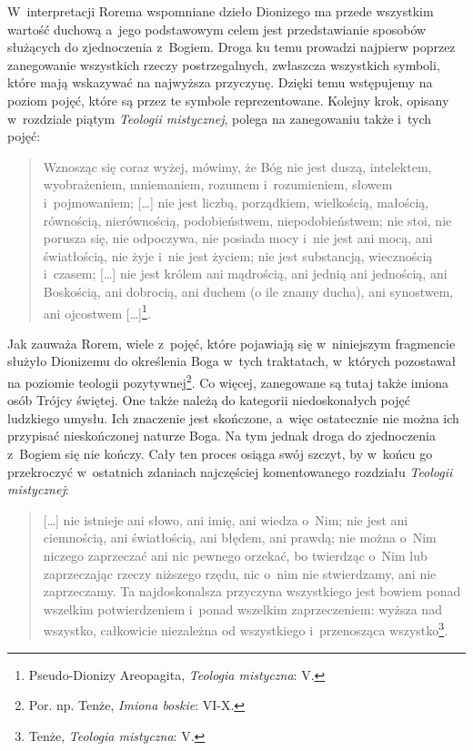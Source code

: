 W~interpretacji Rorema wspomniane dzieło Dionizego ma przede wszystkim wartość duchową a~jego podstawowym celem jest przedstawianie sposobów służących do zjednoczenia z~Bogiem. Droga ku temu prowadzi najpierw poprzez zanegowanie wszystkich rzeczy postrzegalnych, zwłaszcza wszystkich symboli, które mają wskazywać na najwyższa przyczynę. Dzięki temu wstępujemy na poziom pojęć, które są przez te symbole reprezentowane. Kolejny krok, opisany w~rozdziale piątym \textit{Teologii mistycznej}, polega na zanegowaniu także i~tych pojęć:

\begin{quote}
Wznosząc się coraz wyżej, mówimy, że Bóg nie jest duszą, intelektem, wyobrażeniem, mniemaniem, rozumem i~rozumieniem, słowem i~pojmowaniem; [\ldots] nie jest liczbą, porządkiem, wielkością, małością, równością, nierównością, podobieństwem, niepodobieństwem; nie stoi, nie porusza się, nie odpoczywa, nie posiada mocy i~nie jest ani mocą, ani światłością, nie żyje i~nie jest życiem; nie jest substancją, wiecznością i~czasem; [\ldots] nie jest królem ani mądrością, ani jednią ani jednością, ani Boskością, ani dobrocią, ani duchem (o ile znamy ducha), ani synostwem, ani ojcostwem [\ldots]\footnote{Pseudo-Dionizy Areopagita, \textit{Teologia mistyczna}: V.}.
\end{quote}

Jak zauważa Rorem, wiele z~pojęć, które pojawiają się w~niniejszym fragmencie służyło Dionizemu do określenia Boga w~tych traktatach, w~których pozostawał na poziomie teologii pozytywnej\footnote{Por. np. Tenże, \textit{Imiona boskie}: VI-X.}. Co więcej, zanegowane są tutaj także imiona osób Trójcy świętej. One także należą do kategorii niedoskonałych pojęć ludzkiego umysłu. Ich znaczenie jest skończone, a~więc ostatecznie nie można ich przypisać nieskończonej naturze Boga. Na tym jednak droga do zjednoczenia z~Bogiem się nie kończy. Cały ten proces osiąga swój szczyt, by w~końcu go przekroczyć w~ostatnich zdaniach najczęściej komentowanego rozdziału \textit{Teologii mistycznej}:

\begin{quote}
[\ldots] nie istnieje ani słowo, ani imię, ani wiedza o~Nim; nie jest ani ciemnością, ani światłością, ani błędem, ani prawdą; nie można o~Nim niczego zaprzeczać ani nic pewnego orzekać, bo twierdząc o~Nim lub zaprzeczając rzeczy niższego rzędu, nic o~nim nie stwierdzamy, ani nie zaprzeczamy. Ta najdoskonalsza przyczyna wszystkiego jest bowiem ponad wszelkim potwierdzeniem i~ponad wszelkim zaprzeczeniem: wyższa nad wszystko, całkowicie niezależna od wszystkiego i~przenosząca wszystko\footnote{Tenże, \textit{Teologia mistyczna}: V.}.
\end{quote}

